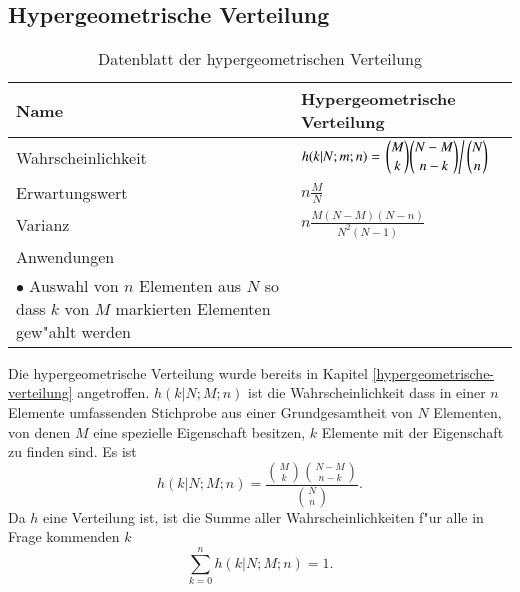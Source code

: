 %
%
%
\subsection{Hypergeometrische Verteilung} \label{section-hypergeometrischeverteilung}
\begin{table}
\renewcommand{\arraystretch}{1.5}
\begin{center}
\begin{tabular}{|l|l|}
\hline
Name&Hypergeometrische Verteilung\\
\hline
Wahrscheinlichkeit&
\begin{minipage}{3.7in}
\vskip3pt
$\displaystyle
h(k|N;m;n)=
\left.\binom{M}{k}\binom{N-M}{n-k}\right/\binom{N}{n}
$
\end{minipage}
\\[10pt]
Erwartungswert&$\displaystyle n\frac{M}{N}$\\[10pt]
Varianz&$\displaystyle
n\frac{M(N-M)(N-n)}{N^2(N-1)}
$\\[10pt]
\hline
Anwendungen&\begin{minipage}{3.7in}%
\vskip3pt
\strut
$\bullet$ Lotto\\
$\bullet$ Auswahl von $n$ Elementen aus $N$ so dass $k$ von $M$ markierten
Elementen gew"ahlt werden
\strut
\end{minipage}\\[18pt]
\hline
\end{tabular}
\end{center}
\caption{Datenblatt der hypergeometrischen Verteilung\label{datenblatt:hypergeometrischeverteilung}}
\end{table}

Die hypergeometrische Verteilung wurde bereits in
Kapitel \ref{hypergeometrische-verteilung} angetroffen.
$h(k|N;M;n)$ ist die
Wahrscheinlichkeit dass in einer $n$ Elemente umfassenden Stichprobe aus
einer Grundgesamtheit von $N$ Elementen, von denen $M$ eine spezielle
Eigenschaft besitzen, $k$ Elemente mit der Eigenschaft zu finden sind.
Es ist
\[
h(k|N;M;n)=\frac{\binom{M}{k}\binom{N-M}{n-k}}{\binom{N}{n}}.
\]
Da $h$ eine Verteilung ist, ist die Summe aller Wahrscheinlichkeiten
f"ur alle in Frage kommenden $k$
\[
\sum_{k=0}^nh(k|N;M;n)=1.
\]
